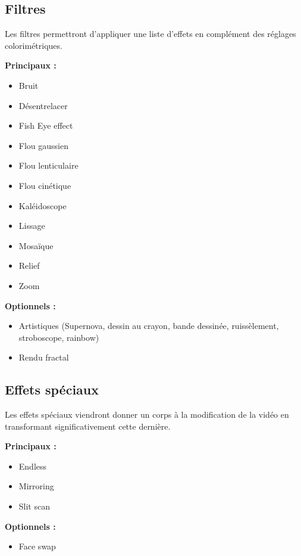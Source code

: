 \subsection{Filtres}

Les filtres permettront d'appliquer une liste d'effets en complément des réglages colorimétriques.

\textbf{ Principaux : }

\begin{itemize}
  \item Bruit
  \item Désentrelacer
  \item Fish Eye effect
  \item Flou gaussien
  \item Flou lenticulaire
  \item Flou cinétique
  \item Kaléidoscope
  \item Lissage
  \item Mosaïque
  \item Relief
  \item Zoom
\end{itemize}

\textbf{ Optionnels : }

\begin{itemize}
  \item Artistiques (Supernova, dessin au crayon, bande dessinée, ruissèlement, stroboscope, rainbow)
  \item Rendu fractal
\end{itemize}

\subsection{Effets spéciaux}

Les effets spéciaux viendront donner un corps à la modification de la vidéo en transformant significativement cette dernière.

\textbf{ Principaux : }

\begin{itemize}
  \item Endless
  \item Mirroring
  \item Slit scan
\end{itemize}

\textbf{ Optionnels : }

\begin{itemize}
  \item Face swap
\end{itemize}

